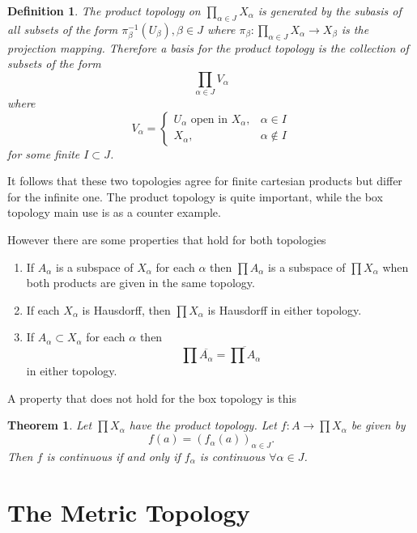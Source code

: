 \documentclass{article}
\newtheorem{theorem}{Theorem}[section]
\newtheorem*{definition}{Definition}
\theoremstyle{remark}
\begin{document}
\begin{definition}
    The product topology on $\prod_{\alpha\in J}X_\alpha$ is generated by the subasis of all subsets of the form $\pi_\beta^{-1}(U_\beta), \beta\in J$
    where $\pi_\beta: \prod_{\alpha\in J}X_\alpha\to X_\beta$ is the projection mapping. 
    Therefore a basis for the product topology is the collection of subsets of the form
    $$\prod_{\alpha\in J}V_\alpha$$
    where 
    $$V_\alpha =\begin{cases}
        U_\alpha\text{ open in }X_\alpha,&\alpha\in I\\
        X_\alpha,&\alpha\not\in I
    \end{cases}$$
    for some finite $I\subset J$.
\end{definition}
It follows that these two topologies agree for finite cartesian products but differ for the infinite one.
The product topology is quite important, while the box topology main use is as a counter example.

However there are some properties that hold for both topologies
\begin{enumerate}
    \item If $A_\alpha$ is a subspace of $X_\alpha$ for each $\alpha$ then $\prod A_\alpha$ is a subspace of $\prod X_\alpha$ when both products are given in the same topology.
    \item If each $X_\alpha$ is Hausdorff, then $\prod X_\alpha$ is Hausdorff in either topology.
    \item If $A_\alpha\subset X_\alpha$ for each $\alpha$ then
     $$\prod\overline{A_\alpha}=\overline{\prod A_\alpha}$$
     in either topology.
\end{enumerate}

A property that does not hold for the box topology is this
\begin{theorem}
    Let $\prod X_\alpha$ have the product topology. Let $f:A\to\prod X_\alpha$ be given by 
    $$f(a)=(f_\alpha(a))_{\alpha\in J}.$$
    Then $f$ is continuous if and only if $f_\alpha$ is continuous $\forall\alpha\in J$.    
\end{theorem}
\section{The Metric Topology}
\end{document}
